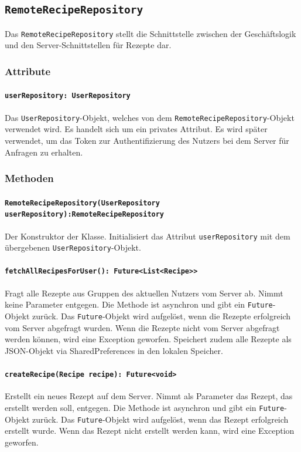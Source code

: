 \documentclass{entwurfsheft}
\begin{document}
\subsection{\texttt{RemoteRecipeRepository}}\label{sec:remotereciperepository}
Das \texttt{RemoteRecipeRepository} stellt die Schnittstelle zwischen der Geschäftslogik und den Server-Schnittstellen für Rezepte dar.
\subsubsection*{Attribute}
\paragraph{\texttt{userRepository: UserRepository}}
Das \texttt{UserRepository}-Objekt, welches von dem \texttt{Remote\-Recipe\-Repository}-Objekt verwendet wird. Es handelt sich um ein privates Attribut. Es wird später verwendet, um das Token zur Authentifizierung des Nutzers bei dem Server für Anfragen zu erhalten.
\subsubsection*{Methoden}
\paragraph{\texttt{RemoteRecipeRepository(UserRepository userRepository):RemoteRecipeRepository\\}}
Der Konstruktor der Klasse. Initialisiert das Attribut \texttt{userRepository} mit dem übergebenen \texttt{UserRepository}-Objekt.
\paragraph{\texttt{fetchAllRecipesForUser(): Future<List<Recipe>>}}
Fragt alle Rezepte aus Gruppen des aktuellen Nutzers vom Server ab. Nimmt keine Parameter entgegen. Die Methode ist asynchron und gibt ein \texttt{Future}-Objekt zurück. Das \texttt{Future}-Objekt wird aufgelöst, wenn die Rezepte erfolgreich vom Server abgefragt wurden. Wenn die Rezepte nicht vom Server abgefragt werden können, wird eine Exception geworfen. Speichert zudem alle Rezepte als JSON-Objekt via \Gls{SharedPreferences} in den lokalen Speicher.
\paragraph{\texttt{createRecipe(Recipe recipe): Future<void>}}
Erstellt ein neues Rezept auf dem Server. Nimmt als Parameter das Rezept, das erstellt werden soll, entgegen. Die Methode ist asynchron und gibt ein \texttt{Future}-Objekt zurück. Das \texttt{Future}-Objekt wird aufgelöst, wenn das Rezept erfolgreich erstellt wurde. Wenn das Rezept nicht erstellt werden kann, wird eine Exception geworfen.
\end{document}
